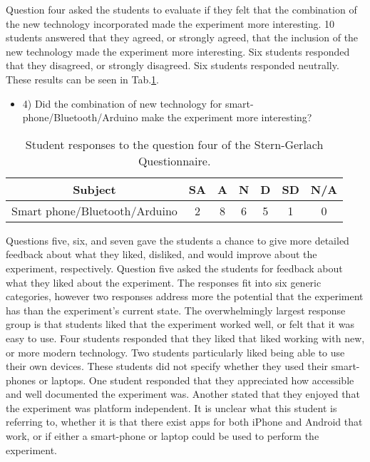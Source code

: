 Question four asked the students to evaluate if they felt that the combination of the new technology incorporated made the experiment more interesting.
10 students answered that they agreed, or strongly agreed, that the inclusion of the new technology made the experiment more interesting.
Six students responded that they disagreed, or strongly disagreed.
Six students responded neutrally.
These results can be seen in Tab.\ref{tab:t14q4}.

\begin{table}[htpb]
  \scriptsize
  \begin{center}
    \caption{\scriptsize Student responses to the question four of the Stern-Gerlach Questionnaire.}
    \label{tab:t14q4}
    \begin{itemize}
    \item  4) Did the combination of new technology for smart-phone/Bluetooth/Arduino make the experiment more interesting?
    \end{itemize}
    

    \begin{tabular}{|c | c | c | c | c | c | c|}
      \hline
      Subject & SA & A & N & D & SD & N/A\\
      \hline
      Smart phone/Bluetooth/Arduino & 2 & 8 & 6 & 5 & 1 & 0\\
      \hline
    \end{tabular}
  \end{center}%
\end{table}

Questions five, six, and seven gave the students a chance to give more detailed feedback about what they liked, disliked, and would improve about the experiment, respectively.
Question five asked the students for feedback about what they liked about the experiment.
The responses fit into six generic categories, however two responses address more the potential that the experiment has than the experiment's current state.
The overwhelmingly largest response group is that students liked that the experiment worked well, or felt that it was easy to use.
Four students responded that they liked that liked working with new, or more modern technology.
Two students particularly liked being able to use their own devices.
These students did not specify whether they used their smart-phones or laptops.
One student responded that they appreciated how accessible and well documented the experiment was.
Another stated that they enjoyed that the experiment was platform independent.
It is unclear what this student is referring to, whether it is that there exist apps for both iPhone and Android that work, or if either a smart-phone or laptop could be used to perform the experiment.

